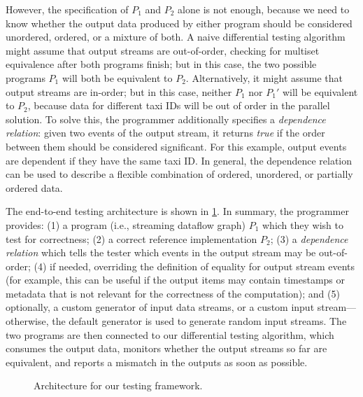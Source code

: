 However, the specification of $P_1$ and $P_2$ alone is not enough, because we need to know whether the output data produced by either program should be considered unordered, ordered, or a mixture of both.
A naive differential testing algorithm might assume that output streams are out-of-order, checking for multiset equivalence after both programs finish; but in this case, the two possible programs $P_1$ will both be equivalent to $P_2$. Alternatively, it might assume that output streams are in-order; but in this case, neither $P_1$ nor $P_1'$ will be equivalent to $P_2$, because data for different taxi IDs will be out of order in the parallel solution.
To solve this, the programmer additionally specifies a \emph{dependence relation}: given two events of the output stream, it returns \emph{true} if the order between them should be considered significant. For this example, output events are dependent if they have the same taxi ID. In general, the dependence relation can be used to describe a flexible
combination of ordered, unordered, or partially ordered data.

The end-to-end testing architecture is shown in \cref{diffstream:fig:system-architecture}. In summary, the programmer provides: (1) a program (i.e., streaming dataflow graph) $P_1$ which they wish to test for correctness; (2) a correct reference implementation $P_2$; (3) a \emph{dependence relation} which tells the tester which events in the output stream may be out-of-order;
(4) if needed, overriding the definition of equality for output stream events (for example, this can be useful if the output items may contain timestamps or metadata that is not relevant for the correctness of the computation); and
(5) optionally, a custom generator of input data streams, or a custom input stream---otherwise, the default generator is used to generate random input streams. The two programs are then connected to our differential testing algorithm, which consumes the output data, monitors whether the output streams so far are equivalent, and reports a mismatch
in the outputs as soon as possible.

\begin{figure}[tb]
\centering
\small


\caption{Architecture for our testing framework.}
\label{diffstream:fig:system-architecture}
\end{figure}


